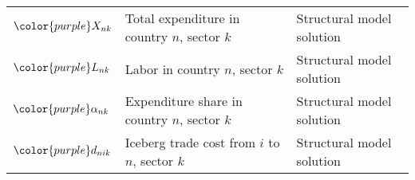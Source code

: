 \begin{table}[h]
\begin{tabular}{|l|l|l|}
${\color{purple}X_{nk}}$ & Total expenditure in country $n$, sector $k$ & Structural model solution \\
${\color{purple}L_{nk}}$ & Labor in country $n$, sector $k$ & Structural model solution \\
${\color{purple}\alpha_{nk}}$ & Expenditure share in country $n$, sector $k$ & Structural model solution \\
${\color{purple}d_{nik}}$ & Iceberg trade cost from $i$ to $n$, sector $k$ & Structural model solution \\
\hline
\end{tabular}
\end{table}

